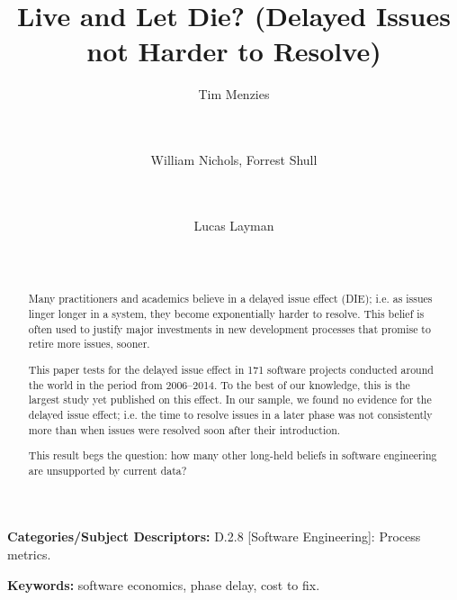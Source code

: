 \documentclass{sig-alternate}
\begin{document}
\title{Live and Let Die? (Delayed Issues   not  Harder to Resolve)}
\author{
Tim Menzies \\
       \\
       \\
\and%
William Nichols, Forrest Shull \\
        \\
        \\
\and %
Lucas Layman \\
        \\
       \\ 
} 
\maketitle
\begin{abstract}
Many  practitioners and academics
believe in a delayed issue effect (DIE); i.e.
 as issues linger longer in a system,
 they become exponentially harder to resolve.
This belief
is often  used to justify 
major investments in  new development
processes that promise to retire more issues, sooner.

This paper tests for the delayed issue effect in
171 software projects conducted around the world in the period from 2006--2014.
To the best of our knowledge,  this is the largest study
yet published on this effect.
In our sample, we found no evidence for the  delayed issue effect; i.e.
the  time  to resolve 
issues in a later phase was not consistently  more than  
when  issues were resolved soon after their introduction. 

This  result begs the question: how many other long-held
beliefs in software engineering are
unsupported by current data? 
\end{abstract}

\vspace{1mm}
\noindent
{\bf Categories/Subject Descriptors:} 
D.2.8 [Software Engineering]: Process metrics.

 

\vspace{1mm}
\noindent
{\bf Keywords:} software economics, phase delay, cost to fix.
 
\end{document}

